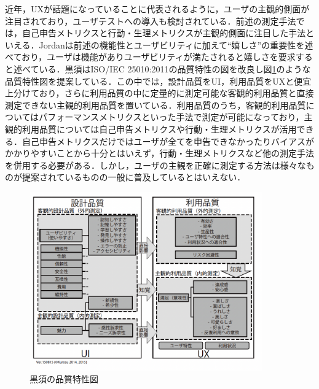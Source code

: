 近年，UXが話題になっていることに代表されるように，ユーザの主観的側面が注目されており，ユーザテストへの導入も検討されている．前述の測定手法では，自己申告メトリクスと行動・生理メトリクスが主観的側面に注目した手法といえる．Jordanは前述の機能性とユーザビリティに加えて``嬉しさ''の重要性を述べており，ユーザは機能がありユーザビリティが満たされると嬉しさを要求すると述べている\cite{jordan2000designing}．黒須はISO/IEC 25010:2011の品質特性の図を改良し図\ref{fig:kurosu2015}のような品質特性図を提案している\cite{kurosu2015}．この中では，設計品質をUI，利用品質をUXと便宜上分けており，さらに利用品質の中に定量的に測定可能な客観的利用品質と直接測定できない主観的利用品質を置いている．利用品質のうち，客観的利用品質についてはパフォーマンスメトリクスといった手法で測定が可能になっており，主観的利用品質については自己申告メトリクスや行動・生理メトリクスが活用できる．自己申告メトリクスだけではユーザが全てを申告できなかったりバイアスがかかりやすいことから十分とはいえず，行動・生理メトリクスなど他の測定手法を併用する必要がある．しかし，ユーザの主観を正確に測定する方法は様々なものが提案されているものの一般に普及しているとはいえない．

\begin{figure}[htbp]
  \begin{minipage}{\hsize}
    \begin{center}
       \includegraphics[width=100mm]{img/kurosu2015.png}
    \end{center}
    \caption{黒須の品質特性図\cite{kurosu}}
    \label{fig:kurosu2015}
  \end{minipage}
\end{figure}

